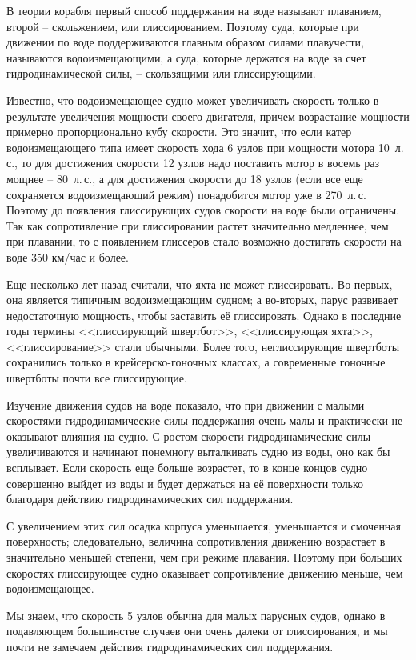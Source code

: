 \documentclass[a4paper, 12pt, twoside, final]{scrbook}
\begin{document}
В теории корабля первый способ поддержания на воде называют плаванием, второй \--- скольжением, или глиссированием. Поэтому суда, которые при движении по воде поддерживаются главным образом силами плавучести, называются водоизмещающими, а суда, которые держатся на воде за счет гидродинамической силы, \--- скользящими или глиссирующими.

Известно, что водоизмещающее судно может увеличивать скорость только в результате увеличения мощности своего двигателя, причем возрастание мощности примерно пропорционально кубу скорости. Это значит, что если катер водоизмещающего типа имеет скорость хода 6 узлов при мощности мотора 10~л.\,с., то для достижения скорости 12 узлов надо поставить мотор в восемь раз мощнее \--- 80~л.\,с., а для достижения скорости до 18 узлов (если все еще сохраняется водоизмещающий режим) понадобится мотор уже в 270~л.\,с. Поэтому до появления глиссирующих судов скорости на воде были ограничены. Так как сопротивление при глиссировании растет значительно медленнее, чем при плавании, то с появлением глиссеров стало возможно достигать скорости на воде 350 км/час и более.

Еще несколько лет назад считали, что яхта не может глиссировать. Во-первых, она является типичным водоизмещающим судном; а во-вторых, парус развивает недостаточную мощность, чтобы заставить её глиссировать. Однако в последние годы термины <<глиссирующий швертбот>>, <<глиссирующая яхта>>, <<глиссирование>> стали обычными. Более того, неглиссирующие швертботы сохранились только в крейсерско-гоночных классах, а современные гоночные швертботы почти все глиссирующие.

Изучение движения судов на воде показало, что при движении с малыми скоростями гидродинамические силы поддержания очень малы и практически не оказывают влияния на судно. С ростом скорости гидродинамические силы увеличиваются и начинают понемногу выталкивать судно из воды, оно как бы всплывает. Если скорость еще больше возрастет, то в конце концов судно совершенно выйдет из воды и будет держаться на её поверхности только благодаря действию гидродинамических сил поддержания.

С увеличением этих сил осадка корпуса уменьшается, уменьшается и смоченная поверхность; следовательно, величина сопротивления движению возрастает в значительно меньшей степени, чем при режиме плавания. Поэтому при больших скоростях глиссирующее судно оказывает сопротивление движению меньше, чем водоизмещающее.

Мы знаем, что скорость 5 узлов обычна для малых парусных судов, однако в подавляющем большинстве случаев они очень далеки от глиссирования, и мы почти не замечаем действия гидродинамических сил поддержания.
\end{document}
